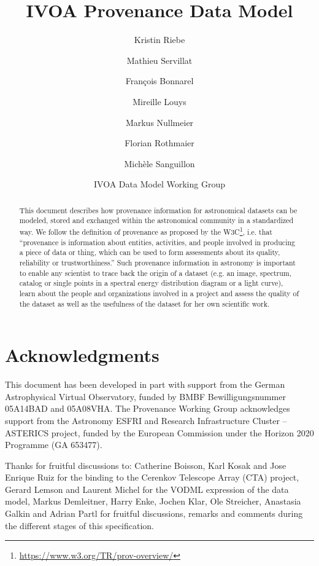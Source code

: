 \documentclass[11pt,a4paper]{ivoa}
\author{Kristin Riebe}
\author{Mathieu Servillat}
\author{François Bonnarel}
\author{Mireille Louys}
\author{Markus Nullmeier}
\author{Florian Rothmaier}
\author{Michèle Sanguillon}
\author{IVOA Data Model Working Group}
\begin{document}

\lstset{escapechar=@,style=customc}


\title{IVOA Provenance Data Model}

\begin{abstract}
This document describes how provenance information for astronomical datasets 
can be modeled, stored and exchanged within 
the astronomical community in a standardized way.
We follow the definition of provenance as proposed by the W3C\footnote{\url{https://www.w3.org/TR/prov-overview/}}, i.e. that ``provenance is information about entities, activities, and people involved in producing a piece of data or thing, which can be used to form assessments about its quality, reliability or trustworthiness.''
Such provenance information in astronomy is important to enable any scientist to trace back
the origin of a dataset (e.g. an image, spectrum, catalog or single points in a 
spectral energy distribution diagram or a light curve), learn about the people and 
organizations involved in a project and assess the quality of the dataset as well
as the usefulness of the dataset for her own scientific work.
\end{abstract}


\section*{Acknowledgments}

This document has been developed in part with support from the German
Astrophysical Virtual Observatory, funded by BMBF Bewilligungsnummer 05A14BAD and 05A08VHA.
The Provenance Working Group acknowledges support from the Astronomy ESFRI and Research Infrastructure Cluster – ASTERICS project, funded by the European Commission under the Horizon 2020 Programme (GA 653477).

Thanks for fruitful discussions to: Catherine Boisson, Karl Kosak and Jose Enrique Ruiz for the
binding to the Cerenkov Telescope Array (CTA) project, Gerard
Lemson and Laurent Michel for the VODML expression of the data model, Markus Demleitner,
Harry Enke, Jochen Klar, Ole Streicher, Anastasia Galkin and Adrian Partl
for fruitful discussions, remarks and comments during the different stages of this
specification.
\end{document}
